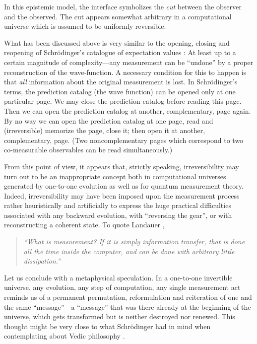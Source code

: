 In this epistemic model, the interface symbolizes the {\em cut} between
the observer and the observed. The cut appears somewhat arbitrary in a
computational universe which is assumed to be uniformly reversible.

What has been discussed above is very similar to the
opening,
closing and reopening of Schr\"odinger's catalogue of expectation values
\cite[p. 53]{schrodinger}:
At least up to
a certain magnitude of complexity---any measurement can be ``undone'' by
a proper reconstruction of the wave-function. A necessary condition for
this to happen is that {\em all} information about the original
measurement is lost.
In Schr\"odinger's terms,
the prediction catalog
(the wave function) can be opened only at one particular page.
We may close
the prediction catalog
before reading this page. Then we can open
the prediction catalog
at another, complementary, page again.
By no way we can open
the prediction catalog at one page, read and (irreversible) memorize the
page, close it; then open it at another, complementary, page.
(Two noncomplementary pages which correspond to two co-measurable
observables can be read simultaneously.)



From this point of view, it appears that, strictly speaking,
irreversibility
may turn out to be an inappropriate concept both in computational
universes generated by one-to-one evolution as well as for quantum
measurement theory. Indeed, irreversibility may have been imposed upon
the measurement process
rather heuristically and artificially to express the huge practical
difficulties associated with any
backward evolution, with ``reversing the gear'', or with reconstructing
a coherent state.
 To quote Landauer
\cite[section 2]{landauer-89},
 \begin{quote}
{\em ``What is measurement? If it is simply information transfer, that
is done all the time inside the computer, and can be done with arbitrary
little dissipation.''}
 \end{quote}

Let us conclude with a metaphysical speculation.
In a one-to-one invertible universe, any  evolution, any step of
computation, any single measurement
act reminds us of a permanent permutation, reformulation and reiteration
of one
and the same ``message''---a ``message'' that was there already at the
beginning of the universe, which gets transformed but is neither
destroyed nor renewed. This thought might be very close to what
Schr\"odinger had in mind when contemplating about Vedic philosophy
\cite{schroed:welt}.




